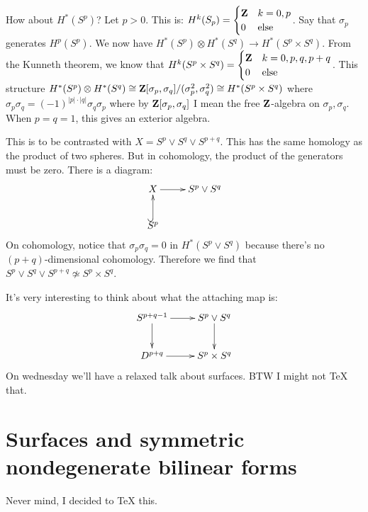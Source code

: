 \begin{example}
How about $ H^\ast(S^p)$? Let $p>0$. This is: $ H^k(S_p) = \begin{cases}\mathbf Z & k=0,p\\ 0 & \text{else}\end{cases}$. Say that $\sigma_p$ generates $ H^p(S^p)$. We now have $ H^\ast(S^p)\otimes H^\ast(S^q)\to H^\ast(S^p\times S^q)$. From the Kunneth theorem, we know that $ H^k(S^p\times S^q)=\begin{cases}\mathbf Z & k=0,p,q,p+q\\ 0 & \text{else}\end{cases}$. This structure $ H^\ast(S^p)\otimes H^\ast(S^q)\cong\mathbf Z[\sigma_p,\sigma_q]/(\sigma_p^2,\sigma_q^2)\cong H^\ast(S^p\times S^q)$ where $\sigma_p\sigma_q=(-1)^{|p|\cdot|q|}\sigma_q\sigma_p$ where by $\mathbf Z[\sigma_p,\sigma_q]$ I mean the free $\mathbf Z$-algebra on $\sigma_p,\sigma_q$. When $p=q=1$, this gives an exterior algebra.
\end{example}
This is to be contrasted with $X=S^p\vee S^q\vee S^{p+q}$. This has the same homology as the product of two spheres. But in cohomology, the product of the generators must be zero. There is a diagram:
\begin{equation*}
\xymatrix{
	X\ar[r] & S^p\vee S^q\\
	S^p\ar@{^(->}[u]
}
\end{equation*}
On cohomology, notice that $\sigma_p\sigma_q=0$ in $ H^\ast(S^p\vee S^q)$ because there's no $(p+q)$-dimensional cohomology. Therefore we find that $S^p\vee S^q\vee S^{p+q}\not\simeq S^p\times S^q$.

It's very interesting to think about what the attaching map is:
\begin{equation*}
\xymatrix{
	S^{p+q-1}\ar[r]\ar[d] & S^p\vee S^q\ar[d]\\
	D^{p+q}\ar[r] & S^p\times S^q
}
\end{equation*}
On wednesday we'll have a relaxed talk about surfaces. BTW I might not TeX that.
\section{Surfaces and symmetric nondegenerate bilinear forms}
Never mind, I decided to TeX this.
